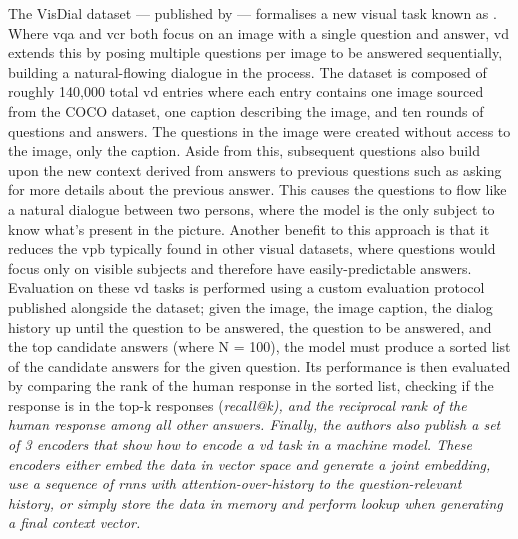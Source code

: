 The VisDial dataset --- published by \citeauthor{das_visual_2019} \cite{das_visual_2019} --- formalises a new visual task known as .
Where \gls{vqa} and \gls{vcr} both focus on an image with a single question and answer, \gls{vd} extends this by posing multiple questions per image to be answered sequentially, building a natural-flowing dialogue in the process.
The dataset is composed of roughly 140,000 total \gls{vd} entries where each entry contains one image sourced from the COCO dataset\cite{lin_microsoft_2015}, one caption describing the image, and ten rounds of questions and answers.
The questions in the image were created without access to the image, only the caption.
Aside from this, subsequent questions also build upon the new context derived from answers to previous questions such as asking for more details about the previous answer.
This causes the questions to flow like a natural dialogue between two persons, where the model is the only subject to know what's present in the picture.
Another benefit to this approach is that it reduces the \gls{vpb} typically found in other visual datasets, where questions would focus only on visible subjects and therefore have easily-predictable answers.
Evaluation on these \gls{vd} tasks is performed using a custom evaluation protocol published alongside the dataset; given the image, the image caption, the dialog history up until the question to be answered, the question to be answered, and the top candidate answers (where N = 100), the model must produce a sorted list of the candidate answers for the given question.
Its performance is then evaluated by comparing the rank of the human response in the sorted list, checking if the response is in the top-k responses (\it{recall@k}), and the reciprocal rank of the human response among all other answers.
Finally, the authors also publish a set of 3 encoders that show how to encode a \gls{vd} task in a machine model.
These encoders either embed the data in vector space and generate a joint embedding, use a sequence of \glspl{rnn} with attention-over-history to the question-relevant history, or simply store the data in memory and perform lookup when generating a final context vector.
